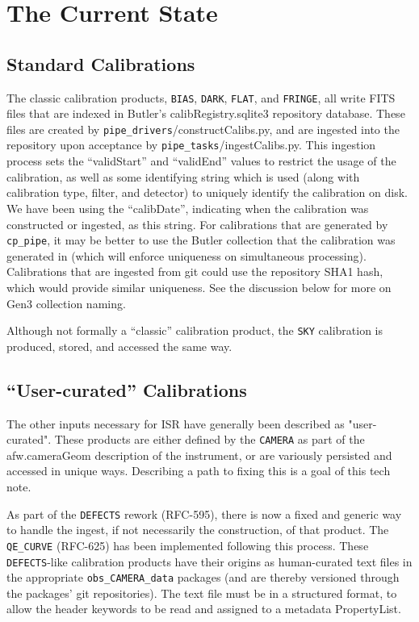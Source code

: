 \documentclass[DM,authoryear,toc]{lsstdoc}
\begin{document}
\section{The Current State}

\subsection{Standard Calibrations}

The classic calibration products, \verb|BIAS|, \verb|DARK|,
\verb|FLAT|, and \verb|FRINGE|, all write FITS files that are indexed
in Butler's calibRegistry.sqlite3 repository database.  These files
are created by \verb|pipe_drivers|/constructCalibs.py, and are
ingested into the repository upon acceptance by
\verb|pipe_tasks|/ingestCalibs.py.  This ingestion process sets the
``validStart'' and ``validEnd'' values to restrict the usage of the
calibration, as well as some identifying string which is used (along
with calibration type, filter, and detector) to uniquely identify the
calibration on disk.  We have been using the ``calibDate'', indicating
when the calibration was constructed or ingested, as this string.  For
calibrations that are generated by \verb|cp_pipe|, it may be better to
use the Butler collection that the calibration was generated in (which
will enforce uniqueness on simultaneous processing).  Calibrations
that are ingested from git could use the repository SHA1 hash, which
would provide similar uniqueness.  See the discussion below for more
on Gen3 collection naming.

Although not formally a ``classic'' calibration product, the \verb|SKY|
calibration is produced, stored, and accessed the same way.

\subsection{``User-curated'' Calibrations}

The other inputs necessary for ISR have generally been described as
"user-curated".  These products are either defined by the \verb|CAMERA| as
part of the afw.cameraGeom description of the instrument, or are
variously persisted and accessed in unique ways.  Describing a path to
fixing this is a goal of this tech note.

As part of the \verb|DEFECTS| rework (RFC-595), there is now a fixed and
generic way to handle the ingest, if not necessarily the construction,
of that product.  The \verb|QE_CURVE| (RFC-625) has been implemented
following this process.  These \verb|DEFECTS|-like calibration products have
their origins as human-curated text files in the appropriate
\verb|obs_CAMERA_data| packages (and are thereby versioned through the
packages' git repositories).  The text file must be in a structured
format, to allow the header keywords to be read and assigned to a
metadata PropertyList.
\end{document}

